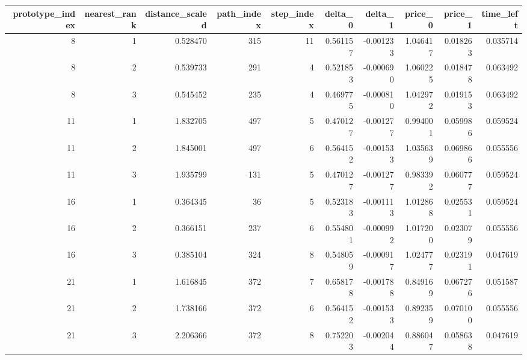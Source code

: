 \begin{tabular}{rrrrrrrrrr}
\toprule
prototype_index & nearest_rank & distance_scaled & path_index & step_index & delta_0 & delta_1 & price_0 & price_1 & time_left \\
\midrule
8 & 1 & 0.528470 & 315 & 11 & 0.561157 & -0.001233 & 1.046417 & 0.018263 & 0.035714 \\
8 & 2 & 0.539733 & 291 & 4 & 0.521853 & -0.000690 & 1.060225 & 0.018478 & 0.063492 \\
8 & 3 & 0.545452 & 235 & 4 & 0.469775 & -0.000810 & 1.042972 & 0.019153 & 0.063492 \\
11 & 1 & 1.832705 & 497 & 5 & 0.470127 & -0.001277 & 0.994001 & 0.059986 & 0.059524 \\
11 & 2 & 1.845001 & 497 & 6 & 0.564152 & -0.001533 & 1.035639 & 0.069866 & 0.055556 \\
11 & 3 & 1.935799 & 131 & 5 & 0.470127 & -0.001277 & 0.983392 & 0.060777 & 0.059524 \\
16 & 1 & 0.364345 & 36 & 5 & 0.523183 & -0.001113 & 1.012868 & 0.025531 & 0.059524 \\
16 & 2 & 0.366151 & 237 & 6 & 0.554801 & -0.000992 & 1.017200 & 0.023079 & 0.055556 \\
16 & 3 & 0.385104 & 324 & 8 & 0.548059 & -0.000917 & 1.024777 & 0.023191 & 0.047619 \\
21 & 1 & 1.616845 & 372 & 7 & 0.658178 & -0.001788 & 0.849169 & 0.067276 & 0.051587 \\
21 & 2 & 1.738166 & 372 & 6 & 0.564152 & -0.001533 & 0.892359 & 0.070100 & 0.055556 \\
21 & 3 & 2.206366 & 372 & 8 & 0.752203 & -0.002044 & 0.886047 & 0.058638 & 0.047619 \\
\bottomrule
\end{tabular}
